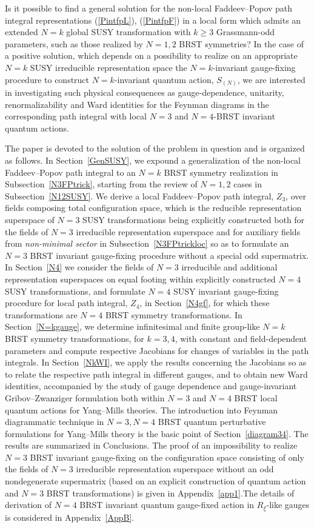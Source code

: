 \documentclass[10pt]{article}
\begin{document}
Is it possible to find a general solution for the non-local
Faddeev--Popov path integral representations (\ref{PintfpL}),
(\ref{PintfpF}) in a local form which admits an extended $N=k$
global SUSY transformation with $k\geq 3$ Grassmann-odd
parameters, such as those realized by $N=1,2$ BRST symmetries? In the case of a positive solution,  which depends on a possibility to realize on an appropriate $N=k$ SUSY irreducible representation space the $N=k$-invariant gauge-fixing procedure to construct $N=k$-invariant quantum action, $S_{(N)}$,  we are interested in investigating such physical
consequences as gauge-dependence, unitarity,  renormalizability and Ward identities
for the Feynman diagrams in the corresponding path integral with
local $N=3$ and $N=4$-BRST invariant quantum actions.

The paper is devoted to the solution of the problem in question and is organized as follows.
In Section~\ref{GenSUSY}, we expound a generalization of the non-local Faddeev--Popov
path integral to an $N=k$ BRST symmetry realization in Subsection~\ref{N3FPtrick}, starting from the review of $N=1,2$ cases in Subsection~\ref{N12SUSY}.
We derive a local Faddeev--Popov path integral, $Z_{3}$, over fields composing total configuration space, which is the reducible representation superspace of  $N=3$ SUSY transformations being explicitly constructed both for  the fields of $N=3$ irreducible representation superspace  and for auxiliary fields from \emph{non-minimal sector}   in Subsection~\ref{N3FPtrickloc} so as to formulate an $N=3$ BRST
invariant gauge-fixing procedure without a special odd
supermatrix. In Section~\ref{N4}  we consider the fields of  $N=3$ irreducible and additional  representation superspaces on equal footing within explicitly constructed  $N=4$ SUSY   transformations, and formulate   $N=4$ SUSY  invariant gauge-fixing procedure for local path integral, $Z_{4}$, in  Section~\ref{N4gf}, for which these transformations are $N=4$ BRST symmetry transformations.
 In Section~\ref{N=kgauge}, we determine infinitesimal
and finite group-like $N=k$  BRST symmetry transformations, for $k=3,4$, with constant and field-dependent
parameters and compute respective Jacobians for changes of variables in the  path integrals.
In Section~\ref{NkWI}, we apply the results concerning the Jacobians so as to relate the
respective path integral in different gauges, and to obtain new
Ward identities, accompanied by the study of gauge dependence and
gauge-invariant Gribov--Zwanziger formulation both within $N=3$
and $N=4$ BRST local quantum actions for Yang--Mills theories.  The introduction into  Feynman diagrammatic technique in $N=3, N=4$ BRST quantum perturbative  formulations for Yang--Mills theory
is  the basic point of  Section~\ref{diagram34}. The results are summarized in Conclusions.
The proof of an impossibility to realize  $N=3$ BRST invariant gauge-fixing on the configuration space  consisting  of only  the fields of $N=3$ irreducible representation
superspace without an odd nondegenerate supermatrix (based on  an explicit construction of quantum action and $N=3$ BRST transformations) is given in Appendix~\ref{app1}.The details of derivation of $N=4$  BRST invariant  quantum gauge-fixed action
in $R_\xi$-like gauges is considered in Appendix~\ref{AppB}.
\end{document}
